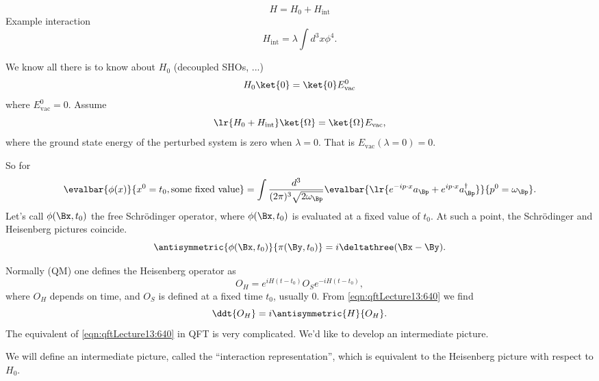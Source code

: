 \begin{dmath}\label{eqn:qftLecture13:520}
H = H_0 + H_{\text{int}}
\end{dmath}
Example interaction
\begin{dmath}\label{eqn:qftLecture13:540}
H_{\text{int}} = \lambda \int d^3 x \phi^4.
\end{dmath}

We know all there is to know about \( H_0 \) (decoupled SHOs, ...)
\begin{dmath}\label{eqn:qftLecture13:560}
H_0 \ket{0} = \ket{0} E^0_{\text{vac}}
\end{dmath}
where \( E^0_{\text{vac}} = 0 \).  Assume
\begin{dmath}\label{eqn:qftLecture13:580}
\lr{ H_0 + H_{\text{int}} } \ket{\Omega} = \ket{\Omega} E_{\text{vac}},
\end{dmath}
where the ground state energy of the perturbed system is zero when \( \lambda = 0 \).  That is \( E_{\text{vac}}(\lambda = 0 ) = 0 \).

So for
\begin{dmath}\label{eqn:qftLecture13:600}
\evalbar{\phi(x) }{x^0 = t_0, \text{some fixed value}}
=
\int \frac{d^3}{(2 \pi)^3 \sqrt{ 2 \omega_\Bp } }
\evalbar{
   \lr{
   e^{-i p \cdot x} a_\Bp
   + e^{i p \cdot x} a_\Bp^\dagger }
   }
{
p^0 = \omega_\Bp
}.
\end{dmath}
Let's call \( \phi(\Bx, t_0) \) the free Schr\"{o}dinger operator, where
\( \phi(\Bx, t_0) \) is evaluated at a fixed value of \( t_0 \).  At such a point, the Schr\"{o}dinger and Heisenberg pictures coincide.
\begin{dmath}\label{eqn:qftLecture13:620}
\antisymmetric{\phi(\Bx, t_0)}{\pi(\By, t_0)} = i \deltathree(\Bx - \By).
\end{dmath}

Normally (QM) one defines the Heisenberg operator as
\begin{dmath}\label{eqn:qftLecture13:640}
O_H = e^{i H(t - t_0)} O_S e^{-i H(t - t_0)},
\end{dmath}
where \( O_H \) depends on time, and \( O_S \) is defined at a fixed time \( t_0 \), usually 0.
From \cref{eqn:qftLecture13:640} we find
\begin{dmath}\label{eqn:qftLecture13:660}
\ddt{O_H} = i \antisymmetric{H}{O_H}.
\end{dmath}
The equivalent of \cref{eqn:qftLecture13:640} in QFT is very complicated.  We'd like to develop an intermediate picture.

We will define an intermediate picture, called the ``interaction representation'', which is equivalent to the Heisenberg picture with respect to \( H_0 \).

